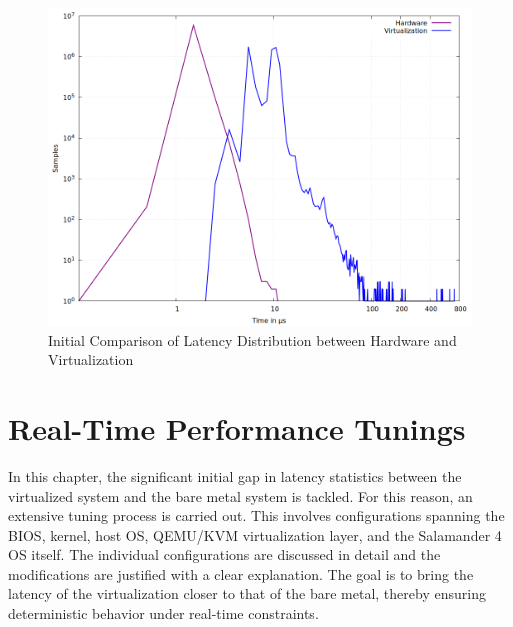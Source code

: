 \documentclass[MMR,Master,english]{twbook}
\begin{document}
\begin{figure}[H]
	\centering
	\includegraphics[width=0.7\columnwidth]{masterthesis-documentation/docs/sigmatek/xenomai/01combined/gnuplot_combined_max_latency.png}
	\caption[Initial Comparison of Latency Distribution between Hardware and Virtualization]{Initial Comparison of Latency Distribution between Hardware and Virtualization}
	\label{fig:gnuplot_max_latency_combined}
\end{figure}

\clearpage

\section{Real-Time Performance Tunings}\label{sec:real-time_tunings}

In this chapter, the significant initial gap in latency statistics between the virtualized system and the bare metal system is tackled. For this reason, an extensive tuning process is carried out. This involves configurations spanning the BIOS, kernel, host OS, QEMU/KVM virtualization layer, and the Salamander 4 OS itself. The individual configurations are discussed in detail and the modifications are justified with a clear explanation. The goal is to bring the latency of the virtualization closer to that of the bare metal, thereby ensuring deterministic behavior under real-time constraints.
\end{document}
